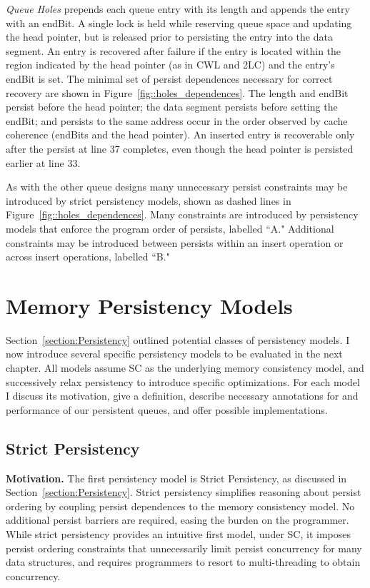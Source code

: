 

\emph{Queue Holes} prepends each queue entry with its length and appends the entry with an endBit.
A single lock is held while reserving queue space and updating the head pointer, but is released prior to persisting the entry into the data segment.
An entry is recovered after failure if the entry is located within the region indicated by the head pointer (as in CWL and 2LC) and the entry's endBit is set.
The minimal set of persist dependences necessary for correct recovery are shown in Figure~\ref{fig::holes_dependences}.
The length and endBit persist before the head pointer; the data segment persists before setting the endBit; and persists to the same address occur in the order observed by cache coherence (endBits and the head pointer).
An inserted entry is recoverable only after the persist at line 37 completes, even though the head pointer is persisted earlier at line 33.

As with the other queue designs many unnecessary persist constraints may be introduced by strict persistency models, shown as dashed lines in Figure~\ref{fig::holes_dependences}.
Many constraints are introduced by persistency models that enforce the program order of persists, labelled ``A."
Additional constraints may be introduced between persists within an insert operation or across insert operations, labelled ``B."

\section{Memory Persistency Models}
\label{sec:PersistencyModels:Models}

Section~\ref{section:Persistency} outlined potential classes of persistency models.
I now introduce several specific persistency models to be evaluated in the next chapter.
All models assume SC as the underlying memory consistency model, and successively relax persistency to introduce specific optimizations.
For each model I discuss its motivation, give a definition, describe necessary annotations for and performance of our persistent queues, and offer possible implementations.

\subsection{Strict Persistency}
\label{section:PersistencyModels:Strict}

\textbf{Motivation.}
The first persistency model is Strict Persistency, as discussed in Section~\ref{section:Persistency}.
Strict persistency simplifies reasoning about persist ordering by coupling persist dependences to the memory consistency model.
No additional persist barriers are required, easing the burden on the programmer.
While strict persistency provides an intuitive first model, under SC, it imposes persist ordering constraints that unnecessarily limit persist concurrency for many data structures, and requires programmers to resort to multi-threading to obtain concurrency.

